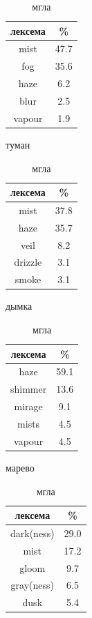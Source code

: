 \begin{table}[H]
\vspace{+20pt}
\begin{small}
\parbox{.24\linewidth}{
\centering
\begin{tabular}{c|c}
\hline
лексема&\%\\
\hline
mist&47.7\\
fog&35.6\\
haze&6.2\\
blur&2.5\\
vapour&1.9\\
\hline
\end{tabular}
\caption{туман}
\label{tuman}
}
\parbox{.24\linewidth}{
\centering
\begin{tabular}{c|c}
\hline
лексема&\%\\
\hline
mist&37.8\\
haze&35.7\\
veil&8.2\\
drizzle&3.1\\
smoke&3.1\\
\hline
\end{tabular}
\caption{дымка}
\label{dymka}
}
\parbox{.24\linewidth}{
\centering
\begin{tabular}{c|c}
\hline
лексема&\%\\
\hline
haze&59.1\\
shimmer&13.6\\
mirage&9.1\\
mists&4.5\\
vapour&4.5\\
\hline
\end{tabular}
\caption{марево}
\label{marevo}
}
\parbox{.24\linewidth}{
\centering
\begin{tabular}{c|c}
\hline
лексема&\%\\
\hline
dark(ness)&29.0\\
mist&17.2\\
gloom&9.7\\
gray(ness)&6.5\\
dusk&5.4\\
\hline
\end{tabular}
\caption{мгла}
\label{mgla}
}
\end{small}
\end{table}

